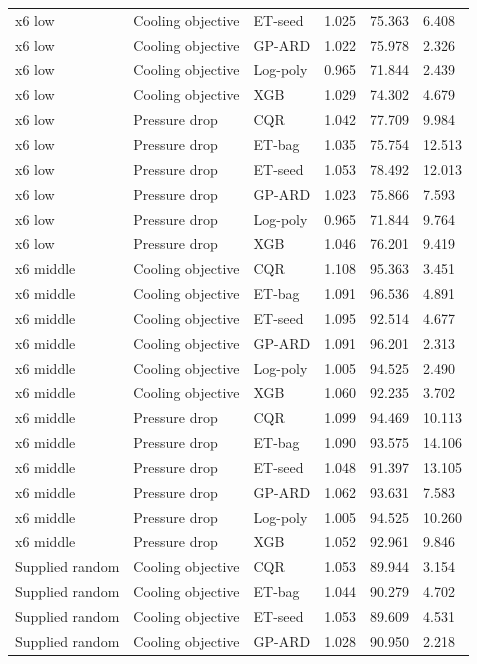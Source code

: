 \begin{longtable}{llllll}
x6 low & Cooling objective & ET-seed & 1.025 & 75.363 & 6.408\\
x6 low & Cooling objective & GP-ARD & 1.022 & 75.978 & 2.326\\
x6 low & Cooling objective & Log-poly & 0.965 & 71.844 & 2.439\\
x6 low & Cooling objective & XGB & 1.029 & 74.302 & 4.679\\
x6 low & Pressure drop & CQR & 1.042 & 77.709 & 9.984\\
x6 low & Pressure drop & ET-bag & 1.035 & 75.754 & 12.513\\
x6 low & Pressure drop & ET-seed & 1.053 & 78.492 & 12.013\\
x6 low & Pressure drop & GP-ARD & 1.023 & 75.866 & 7.593\\
x6 low & Pressure drop & Log-poly & 0.965 & 71.844 & 9.764\\
x6 low & Pressure drop & XGB & 1.046 & 76.201 & 9.419\\
x6 middle & Cooling objective & CQR & 1.108 & 95.363 & 3.451\\
x6 middle & Cooling objective & ET-bag & 1.091 & 96.536 & 4.891\\
x6 middle & Cooling objective & ET-seed & 1.095 & 92.514 & 4.677\\
x6 middle & Cooling objective & GP-ARD & 1.091 & 96.201 & 2.313\\
x6 middle & Cooling objective & Log-poly & 1.005 & 94.525 & 2.490\\
x6 middle & Cooling objective & XGB & 1.060 & 92.235 & 3.702\\
x6 middle & Pressure drop & CQR & 1.099 & 94.469 & 10.113\\
x6 middle & Pressure drop & ET-bag & 1.090 & 93.575 & 14.106\\
x6 middle & Pressure drop & ET-seed & 1.048 & 91.397 & 13.105\\
x6 middle & Pressure drop & GP-ARD & 1.062 & 93.631 & 7.583\\
x6 middle & Pressure drop & Log-poly & 1.005 & 94.525 & 10.260\\
x6 middle & Pressure drop & XGB & 1.052 & 92.961 & 9.846\\
Supplied random & Cooling objective & CQR & 1.053 & 89.944 & 3.154\\
Supplied random & Cooling objective & ET-bag & 1.044 & 90.279 & 4.702\\
Supplied random & Cooling objective & ET-seed & 1.053 & 89.609 & 4.531\\
Supplied random & Cooling objective & GP-ARD & 1.028 & 90.950 & 2.218\\

\end{longtable}
